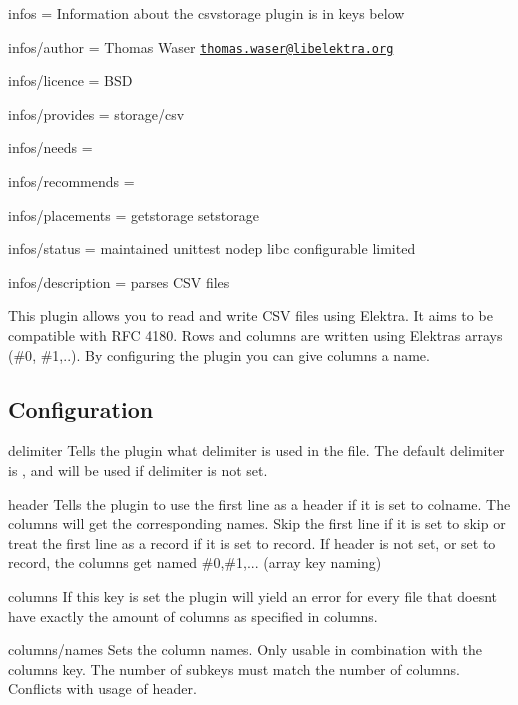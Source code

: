 
\begin{DoxyItemize}
\item infos = Information about the csvstorage plugin is in keys below
\item infos/author = Thomas Waser \href{mailto:thomas.waser@libelektra.org}{\tt thomas.\+waser@libelektra.\+org}
\item infos/licence = B\+SD
\item infos/provides = storage/csv
\item infos/needs =
\item infos/recommends =
\item infos/placements = getstorage setstorage
\item infos/status = maintained unittest nodep libc configurable limited
\item infos/description = parses C\+SV files
\end{DoxyItemize}

This plugin allows you to read and write C\+SV files using Elektra. It aims to be compatible with R\+FC 4180. Rows and columns are written using Elektra\textquotesingle{}s arrays ({\ttfamily \#0}, {\ttfamily \#1},..). By configuring the plugin you can give columns a name.

\subsection*{Configuration}

{\ttfamily delimiter} Tells the plugin what delimiter is used in the file. The default delimiter is {\ttfamily ,} and will be used if {\ttfamily delimiter} is not set.

{\ttfamily header} Tells the plugin to use the first line as a header if it is set to {\ttfamily colname}. The columns will get the corresponding names. Skip the first line if it is set to {\ttfamily skip} or treat the first line as a record if it is set to {\ttfamily record}. If {\ttfamily header} is not set, or set to {\ttfamily record}, the columns get named \#0,\#1,... (array key naming)

{\ttfamily columns} If this key is set the plugin will yield an error for every file that doesn\textquotesingle{}t have exactly the amount of columns as specified in {\ttfamily columns}.

{\ttfamily columns/names} Sets the column names. Only usable in combination with the {\ttfamily columns} key. The number of subkeys must match the number of columns. Conflicts with usage of {\ttfamily header}.

